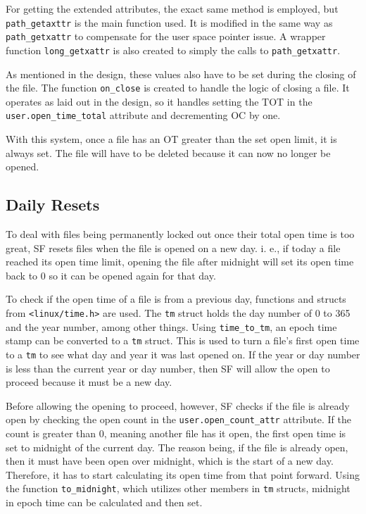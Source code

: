 For getting the extended attributes, the exact same method is employed, but \texttt{path\_getaxttr} is the main function used. It is modified in the same way as \texttt{path\_getxattr} to compensate for the user space pointer issue. A wrapper function \texttt{long\_getxattr} is also created to simply the calls to \texttt{path\_getxattr}.

As mentioned in the design, these values also have to be set during the closing of the file. The function \texttt{on\_close} is created to handle the logic of closing a file. It operates as laid out in the design, so it handles setting the TOT in the \texttt{user.open\_time\_total} attribute and decrementing OC by one.

With this system, once a file has an OT greater than the set open limit, it is always set. The file will have to be deleted because it can now no longer be opened.

\subsection{Daily Resets}

To deal with files being permanently locked out once their total open time is too great, SF resets files when the file is opened on a new day. i. e., if today a file reached its open time limit, opening the file after midnight will set its open time back to 0 so it can be opened again for that day.

To check if the open time of a file is from a previous day, functions and structs from \texttt{<linux/time.h>} are used. The \texttt{tm} struct holds the day number of 0 to 365 and the year number, among other things. Using \texttt{time\_to\_tm}, an epoch time stamp can be converted to a \texttt{tm} struct. This is used to turn a file's first open time to a \texttt{tm} to see what day and year it was last opened on. If the year or day number is less than the current year or day number, then SF will allow the open to proceed because it must be a new day.

Before allowing the opening to proceed, however, SF checks if the file is already open by checking the open count in the \texttt{user.open\_count\_attr} attribute. If the count is greater than 0, meaning another file has it open, the first open time is set to midnight of the current day. The reason being, if the file is already open, then it must have been open over midnight, which is the start of a new day. Therefore, it has to start calculating its open time from that point forward. Using the function \texttt{to\_midnight}, which utilizes other members in \texttt{tm} structs, midnight in epoch time can be calculated and then set.

